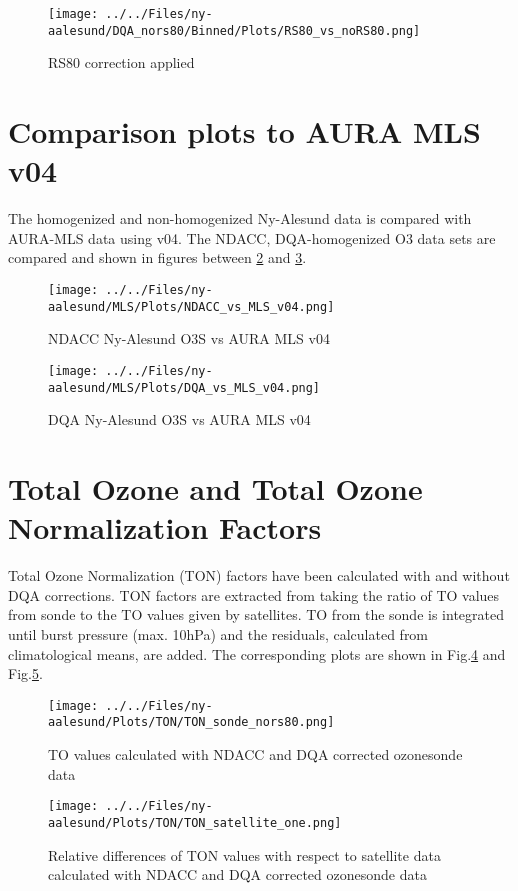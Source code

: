 \documentclass{article}
\begin{document}
                        \begin{figure}
        \centering
\texttt{[image: ../../Files/ny-aalesund/DQA\_nors80/Binned/Plots/RS80\_vs\_noRS80.png]}
    \caption{RS80 correction applied}
            \label{fig:rs80}
    \end{figure}
%
%
\section{Comparison plots to AURA MLS v04}

The homogenized and non-homogenized Ny-Alesund data is compared with AURA-MLS data using v04. The
NDACC, DQA-homogenized O3 data sets are compared and shown in figures between
\ref{fig:niwav04} and \ref{fig:dqav04_rs80}.

\begin{figure}
\centering
\texttt{[image: ../../Files/ny-aalesund/MLS/Plots/NDACC\_vs\_MLS\_v04.png]}
\caption{ NDACC Ny-Alesund O3S vs AURA MLS v04  }
\label{fig:niwav04}
\end{figure}


\begin{figure}
\centering
\texttt{[image: ../../Files/ny-aalesund/MLS/Plots/DQA\_vs\_MLS\_v04.png]}
\caption{DQA Ny-Alesund O3S vs AURA MLS v04 }
\label{fig:dqav04_rs80}
\end{figure}

        \section{Total Ozone and Total Ozone Normalization Factors}

Total Ozone Normalization (TON) factors have been calculated with and without DQA corrections. TON factors are
extracted
from taking the ratio of TO values from sonde to the TO values given by satellites. TO from the sonde is integrated until
burst pressure (max. 10hPa) and the residuals, calculated from climatological means, are added.
The corresponding plots are shown in Fig.\ref{fig:ton1} and  Fig.\ref{fig:ton2}.

                                \begin{figure}
        \centering
\texttt{[image: ../../Files/ny-aalesund/Plots/TON/TON\_sonde\_nors80.png]}
    \caption{TO values calculated with NDACC and DQA corrected ozonesonde data}
            \label{fig:ton1}
    \end{figure}

                                 \begin{figure}
        \centering
\texttt{[image: ../../Files/ny-aalesund/Plots/TON/TON\_satellite\_one.png]}
    \caption{Relative differences of TON values with respect to satellite data calculated with NDACC and DQA corrected ozonesonde data}
            \label{fig:ton2}
    \end{figure}
\end{document}
